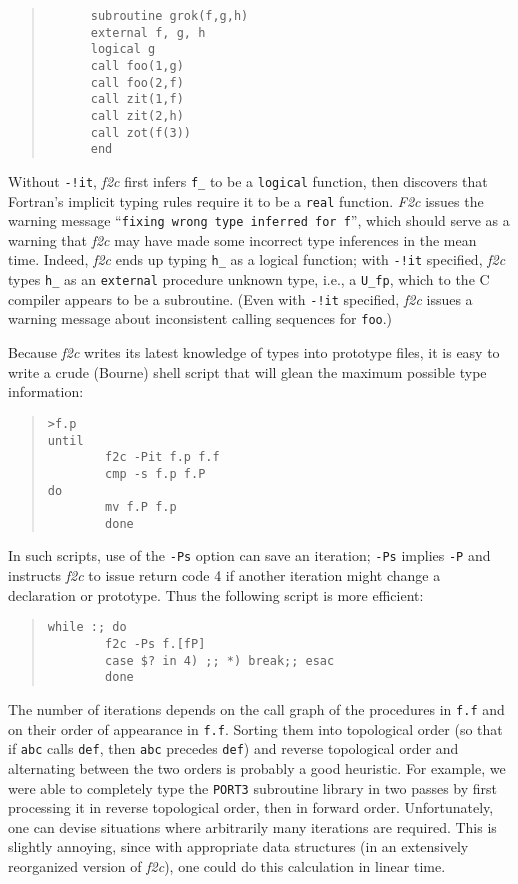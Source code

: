 \documentclass[12pt]{article}
\begin{document}
\begin{quote}
\begin{verbatim}
      subroutine grok(f,g,h)
      external f, g, h
      logical g
      call foo(1,g)
      call foo(2,f)
      call zit(1,f)
      call zit(2,h)
      call zot(f(3))
      end
\end{verbatim}
\end{quote}
Without \verb|-!it|, \emph{f2c} first infers \verb|f_| to be a \verb|logical| function, then discovers that Fortran’s implicit typing rules require it to be a \verb|real| function. \emph{F2c} issues the warning message ``\texttt{fixing wrong type inferred for f}'', which should serve as a warning that \emph{f2c} may have made some incorrect type inferences in the mean time. Indeed, \emph{f2c} ends up typing \verb|h_| as a logical function; with \verb|-!it| specified, \emph{f2c} types \verb|h_| as an \verb|external| procedure unknown type, i.e., a \verb|U_fp|, which to the C compiler appears to be a subroutine. (Even with \verb|-!it| specified, \emph{f2c} issues a warning message about inconsistent calling sequences for \verb|foo|.)

Because \emph{f2c} writes its latest knowledge of types into prototype files, it is easy to write a crude (Bourne) shell script that will glean the maximum possible type information:
\begin{quote}
\begin{verbatim}
>f.p
until
        f2c -Pit f.p f.f
        cmp -s f.p f.P
do
        mv f.P f.p
        done
\end{verbatim}
\end{quote}
In such scripts, use of the \verb|-Ps| option can save an iteration; \verb|-Ps| implies \verb|-P| and instructs \emph{f2c} to issue return code 4 if another iteration might change a declaration or prototype. Thus the following script is more efficient:
\begin{quote}
\begin{verbatim}
while :; do
        f2c -Ps f.[fP]
        case $? in 4) ;; *) break;; esac
        done
\end{verbatim}
\end{quote}
The number of iterations depends on the call graph of the procedures in \verb|f.f| and on their order of appearance in \verb|f.f|. Sorting them into topological order (so that if \verb|abc| calls \verb|def|, then \verb|abc| precedes \verb|def|) and reverse topological order and alternating between the two orders is probably a good heuristic. For example, we were able to completely type the \verb|PORT3| subroutine library in two passes by first processing it in reverse topological order, then in forward order. Unfortunately, one can devise situations where arbitrarily many iterations are required. This is slightly annoying, since with appropriate data structures (in an extensively reorganized version of \emph{f2c}), one could do this calculation in linear time.
\end{document}
